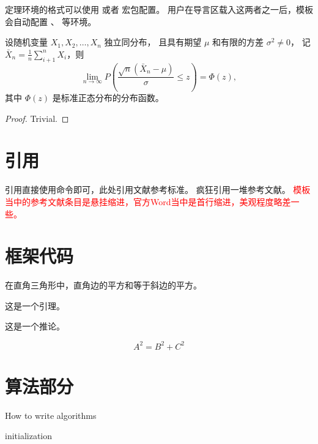 定理环境的格式可以使用  或者  宏包配置。
用户在导言区载入这两者之一后，模板会自动配置 、 等环境。

\begin{theorem}
  设随机变量 $X_1, X_2, \dots, X_n$ 独立同分布， 且具有期望 $\mu$ 和有限的方差 $\sigma^2 \ne 0$，
  记 $\bar{X}_n = \frac{1}{n} \sum_{i+1}^n X_i$，则
  \begin{equation}
    \lim_{n \to \infty} P \left(\frac{\sqrt{n} \left( \bar{X}_n - \mu \right)}{\sigma} \le z \right) = \Phi(z),
  \end{equation}
  其中 $\Phi(z)$ 是标准正态分布的分布函数。
\end{theorem}
\begin{proof}
  Trivial.
\end{proof}






\section{引用}
引用直接使用命令即可，此处引用文献参考标准\cite{gbt7714-2005}。
疯狂引用一堆参考文献\cite{Gendron1991ComeonplusPA,gbt7714-2005,liende2020SG3}。
\textcolor{red}{模板当中的参考文献条目是悬挂缩进，官方Word当中是首行缩进，美观程度略差一些。}
\section{框架代码}
\begin{theorem}[毕达哥拉斯定理]
  在直角三角形中，直角边的平方和等于斜边的平方。
\end{theorem}

\begin{lemma}
  这是一个引理。
\end{lemma}

\begin{corollary}
  这是一个推论。
\end{corollary}

\begin{equation}
  A^2=B^2+C^2
\end{equation}


\section{算法部分}
\begin{algorithm}[htb]
  \caption{How to write algorithms}
  \label{algo:algo2}
  initialization\;
\end{algorithm}

